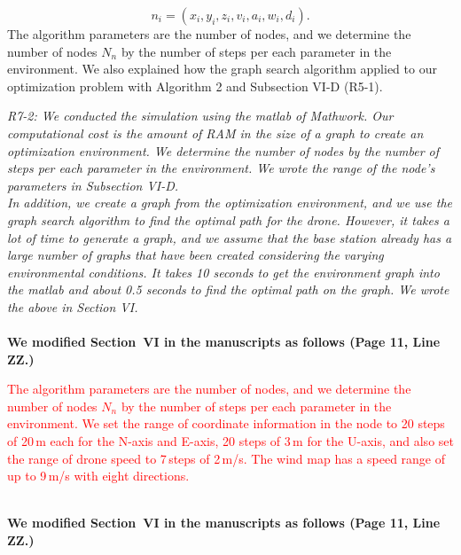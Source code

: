 \documentclass[onecolumn]{IEEEconf}
\begin{document}
\begin{description}
{    \begin{equation*}
    n_i = (x_i, y_i, z_i, v_i, a_i, w_i, d_i). \tag{6.1} \label{eq:node}
    \end{equation*}
    The algorithm parameters are the number of nodes, and we determine the number of nodes $N_n$ by the number of steps per each parameter in the environment. 
    We also explained how the graph search algorithm applied to our optimization problem with Algorithm 2 and Subsection VI-D (R5-1).
	}
	~\\
	\item \textit
	{
	R7-2: We conducted the simulation using the matlab of Mathwork. Our computational cost is the amount of RAM in the size of a graph to create an optimization environment. We determine the number of nodes by the number of steps per each parameter in the environment. We wrote the range of the node’s parameters in Subsection VI-D.~\\
    In addition, we create a graph from the optimization environment, and we use the graph search algorithm to find the optimal path for the drone. However, it takes a lot of time to generate a graph, and we assume that the base station already has a large number of graphs that have been created considering the varying environmental conditions. It takes 10 seconds to get the environment graph into the matlab and about 0.5 seconds to find the optimal path on the graph. We wrote the above in Section VI.
	}
	~\\
	~\\
	\textbf{We modified Section~VI in the manuscripts as follows (Page 11, Line ZZ.)}\\
    \begin{mdframed}[ linewidth=.75pt, userdefinedwidth=0.9\textwidth]
    \textcolor{red}{The algorithm parameters are the number of nodes, and we determine the number of nodes $N_n$ by the number of steps per each parameter in the environment.  
    We set the range of coordinate information in the node to 20 steps of 20\,m each for the N-axis and E-axis, 20 steps of 3\,m for the U-axis, and also set the range of drone speed to 7\,steps of 2\,m/s. 
    The wind map has a speed range of up to 9\,m/s with eight directions.
    }
    \end{mdframed} 
    ~\\
	\textbf{We modified Section~VI in the manuscripts as follows (Page 11, Line ZZ.)}\\
    \begin{mdframed}[ linewidth=.75pt, userdefinedwidth=0.9\textwidth]

\end{mdframed}
\end{description}
\end{document}
